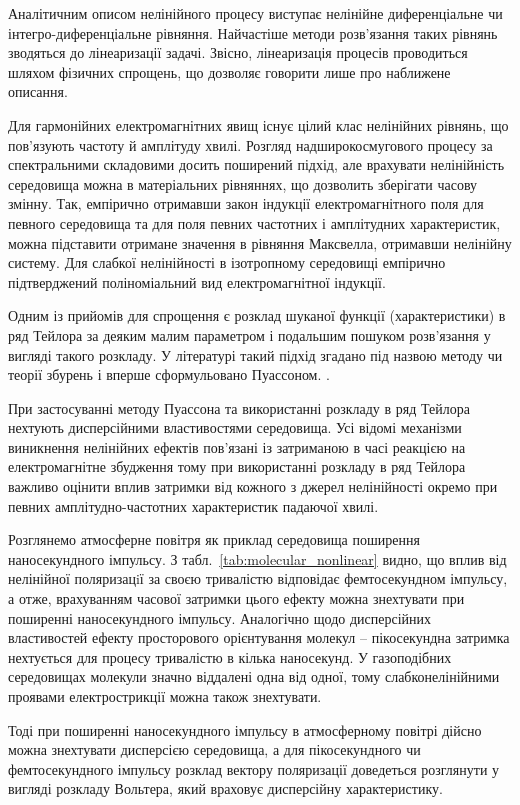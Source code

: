 Аналітичним описом нелінійного процесу виступає нелінійне диференціальне чи 
інтегро-диференціальне рівняння. Найчастіше методи розв'язання таких рівнянь
зводяться до лінеаризації задачі. Звісно, лінеаризація процесів проводиться шляхом
фізичних спрощень, що дозволяє говорити лише про наближене описання.

Для гармонійних електромагнітних явищ існує цілий клас нелінійних рівнянь, що 
пов'язують частоту й амплітуду хвилі. Розгляд надширокосмугового процесу
за спектральними складовими досить поширений підхід, але врахувати нелінійність 
середовища можна в матеріальних рівняннях, що дозволить зберігати часову змінну.
Так, емпірично отримавши закон індукції електромагнітного поля для певного 
середовища та для поля певних частотних і амплітудних характеристик, можна 
підставити отримане значення в рівняння Максвелла, отримавши нелінійну систему.
Для слабкої нелінійності в ізотропному середовищі емпірично 
підтверджений поліноміальний вид електромагнітної індукції.

Одним із прийомів для спрощення є розклад шуканої функції (характеристики) в 
ряд Тейлора за деяким малим параметром і подальшим пошуком розв'язання у 
вигляді такого розкладу. У літературі такий підхід згадано під назвою 
методу чи теорії збурень і вперше сформульовано Пуассоном.
\cite{imp:NonlinearWaves1983}.

При застосуванні методу Пуассона та використанні розкладу в ряд Тейлора 
нехтують дисперсійними властивостями середовища. Усі відомі механізми 
виникнення нелінійних ефектів пов'язані із затриманою в часі реакцією на 
електромагнітне збудження тому при використанні розкладу в ряд Тейлора 
важливо оцінити вплив затримки від кожного з джерел нелінійності окремо 
при певних амплітудно-частотних характеристик падаючої хвилі. 

Розглянемо атмосферне повітря як приклад середовища поширення
наносекундного імпульсу. З табл.~\ref{tab:molecular_nonlinear} видно, що вплив 
від нелінійної поляризацiї за своєю тривалістю відповідає фемтосекундном 
імпульсу, а отже, врахуванням часової затримки цього ефекту можна знехтувати 
при поширенні наносекундного імпульсу. Аналогічно щодо дисперсійних 
властивостей ефекту просторового орієнтування молекул -- пікосекундна 
затримка нехтується для процесу тривалістю в кілька наносекунд. 
У газоподібних середовищах молекули значно віддалені одна від одної, тому
слабконелінійними проявами електрострикції можна також знехтувати.

Тоді при поширенні наносекундного імпульсу в атмосферному повітрі дійсно 
можна знехтувати дисперсією середовища, а для пікосекундного чи 
фемтосекундного імпульсу розклад вектору поляризації доведеться розглянути 
у вигляді розкладу Вольтера, який враховує дисперсійну характеристику.

